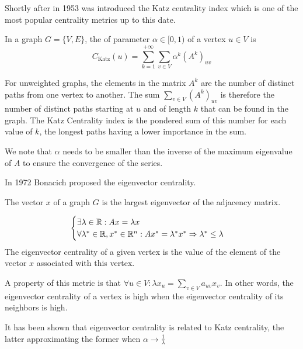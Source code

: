 Shortly after in 1953 was introduced the Katz centrality index \cite{katz1953_NewStatusIndex} which is one of the most popular centrality metrics up to this date.

\begin{definition}
    In a graph $G = \{V, E\}$, the  of parameter $\alpha \in [0, 1)$ of a vertex $u \in V$ is
    \begin{equation}
        C_{\text{Katz}}(u) = \sum_{k=1}^{+\infty} \sum_{v\in V} \alpha^k (A^k)_{uv}
    \end{equation}
\end{definition}

For unweighted graphs, the elements in the matrix $A^k$ are the number of distinct paths from one vertex to another. The sum $\sum_{v\in V} (A^k)_{uv}$ is therefore the number of distinct paths starting at $u$ and of length $k$ that can be found in the graph. The Katz Centrality index is the pondered sum of this number for each value of $k$, the longest paths having a lower importance in the sum.

We note that $\alpha$ needs to be smaller than the inverse of the maximum eigenvalue of $A$ to ensure the convergence of the series.

In 1972 Bonacich \cite{bonacich1972_eigenvect_centrality} proposed the eigenvector centrality.
\begin{definition}
    The  vector $x$ of a graph $G$ is the largest eigenvector of the adjacency matrix.
    
\begin{equation}
    \begin{cases}
        \exists \lambda \in \mathbb{R} : Ax = \lambda x \\
        \forall \lambda^* \in \mathbb{R}, x^* \in \mathbb{R}^n : Ax^* = \lambda^* x^* \Rightarrow \lambda^* \leq \lambda
    \end{cases}
\end{equation}
    The eigenvector centrality of a given vertex is the value of the element of the vector $x$ associated with this vertex.
\end{definition}


A property of this metric is that $\forall u \in V : \lambda x_u = \sum_{v \in V} a_{uv} x_v$. In other words, the eigenvector centrality of a vertex is high when the eigenvector centrality of its neighbors is high.

It has been shown \cite{bonacich2007_UniquePropertiesEigenvector} that eigenvector centrality is related to Katz centrality, the latter approximating the former when  $\alpha \to \frac{1}{\lambda}$

